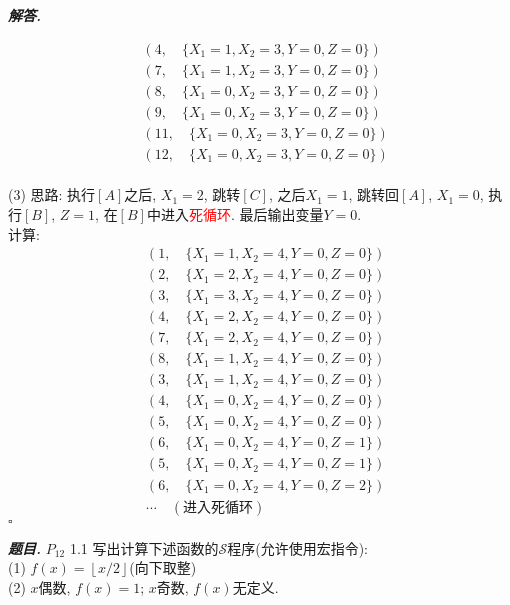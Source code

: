 \documentclass[10pt, a4paper, oneside]{ctexart}
\newenvironment{problem}{\begin{framed}\par\noindent\textbf{\textit{题目. }}}{\end{framed}\par}
\newenvironment{solution}{%
  \par\noindent\textbf{\textit{解答. }}\ignorespaces
}{%
  \hfill\ensuremath{\square}\par
}
\begin{document}
\begin{solution}
\begin{align*}
&(4, \quad \{X_1=1,X_2=3,Y=0,Z=0\})\\
&(7, \quad \{X_1=1,X_2=3,Y=0,Z=0\})\\
&(8, \quad \{X_1=0,X_2=3,Y=0,Z=0\})\\
&(9, \quad \{X_1=0,X_2=3,Y=0,Z=0\})\\
&(11, \quad \{X_1=0,X_2=3,Y=0,Z=0\})\\
&(12, \quad \{X_1=0,X_2=3,Y=0,Z=0\})
\end{align*}
\\(3) 思路: 执行$[A]$之后, $X_1=2$, 跳转$[C]$, 之后$X_1=1$, 跳转回$[A]$, $X_1=0$, 执行$[B]$, $Z=1$, 在$[B]$中进入\textcolor{red}{死循环}. 最后输出变量$Y=0$.\\
计算: 
\begin{align*}
&(1, \quad \{X_1=1,X_2=4,Y=0,Z=0\})\\
&(2, \quad \{X_1=2,X_2=4,Y=0,Z=0\})\\
&(3, \quad \{X_1=3,X_2=4,Y=0,Z=0\})\\
&(4, \quad \{X_1=2,X_2=4,Y=0,Z=0\})\\
&(7, \quad \{X_1=2,X_2=4,Y=0,Z=0\})\\
&(8, \quad \{X_1=1,X_2=4,Y=0,Z=0\})\\
&(3, \quad \{X_1=1,X_2=4,Y=0,Z=0\})\\
&(4, \quad \{X_1=0,X_2=4,Y=0,Z=0\})\\
&(5, \quad \{X_1=0,X_2=4,Y=0,Z=0\})\\
&(6, \quad \{X_1=0,X_2=4,Y=0,Z=1\})\\
&(5, \quad \{X_1=0,X_2=4,Y=0,Z=1\})\\
&(6, \quad \{X_1=0,X_2=4,Y=0,Z=2\})\\
&\cdots \quad (\text{进入死循环})
\end{align*}
\end{solution}

\begin{problem}
$P_{12}$ 1.1 写出计算下述函数的$\mathscr{S}$程序(允许使用宏指令):\\
(1) $f(x)=\left\lfloor x/2 \right\rfloor$(向下取整)\\
(2) $x$偶数, $f(x)=1$; $x$奇数, $f(x)$无定义.
\end{problem}
\end{document}
